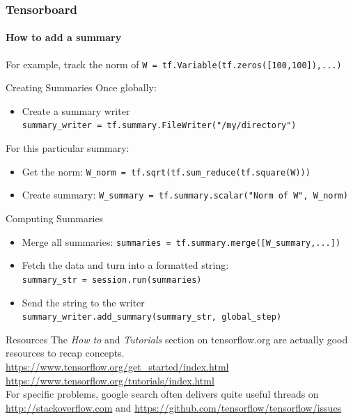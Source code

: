 \documentclass[mathserif]{beamer}
\begin{document}
\begin{frame}[fragile]
	\frametitle{Tensorboard}
	\framesubtitle{How to add a summary}
	For example, track the norm of \texttt{W = tf.Variable(tf.zeros([100,100]),...)}
	\begin{block}{Creating Summaries}
			Once globally:
			\begin{itemize}
				\item Create a summary writer\\ \texttt{summary\_writer =  tf.summary.FileWriter("/my/directory")}
			\end{itemize}
			For this particular summary:
			\begin{itemize}
				\item Get the norm: \texttt{W\_norm = tf.sqrt(tf.sum\_reduce(tf.square(W)))}
				\item Create summary: \texttt{W\_summary = tf.summary.scalar("Norm of W", W\_norm)}
			\end{itemize}
	\end{block}
	\begin{block}{Computing Summaries}
		\begin{itemize}
			\item Merge all summaries: \texttt{summaries = tf.summary.merge([W\_summary,...])}
			\item Fetch the data and turn into a formatted string:\\
			 \texttt{summary\_str = session.run(summaries)}
			\item Send the string to the writer\\
			\texttt{summary\_writer.add\_summary(summary\_str, global\_step)}
		\end{itemize}
	\end{block}
\end{frame}

\begin{frame}{Resources}
	The \textit{How to} and \textit{Tutorials} section on tensorflow.org are actually good resources to recap concepts.\\
	\url{https://www.tensorflow.org/get_started/index.html}\\
	\url{https://www.tensorflow.org/tutorials/index.html}\\
	\vspace{2cm}
	For specific problems, google search often delivers quite useful threads on \url{http://stackoverflow.com} and \url{https://github.com/tensorflow/tensorflow/issues}
\end{frame}
\end{document}
